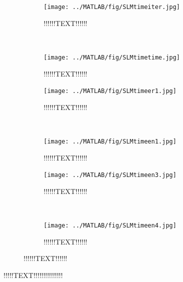 \begin{figure}[H]
        \centering
        \begin{subfigure}[b]{0.3\textwidth}
                \texttt{[image: ../MATLAB/fig/SLMtimeiter.jpg]}
                \caption{ !!!!!!TEXT!!!!!! }
                \label{fig:SLMtimeer1}
        \end{subfigure}
        ~
        \begin{subfigure}[b]{0.3\textwidth}
                \texttt{[image: ../MATLAB/fig/SLMtimetime.jpg]}
                \caption{ !!!!!!TEXT!!!!!! }
                \label{fig:SLMtimeen1}
        \end{subfigure}        
        
        \begin{subfigure}[b]{0.3\textwidth}
                \texttt{[image: ../MATLAB/fig/SLMtimeer1.jpg]}
                \caption{ !!!!!!TEXT!!!!!! }
                \label{fig:SLMtimeer1}
        \end{subfigure}
        ~
        \begin{subfigure}[b]{0.3\textwidth}
                \texttt{[image: ../MATLAB/fig/SLMtimeen1.jpg]}
                \caption{ !!!!!!TEXT!!!!!! }
                \label{fig:SLMtimeen1}
        \end{subfigure}
        
        \begin{subfigure}[b]{0.3\textwidth}
                \texttt{[image: ../MATLAB/fig/SLMtimeen3.jpg]}
                \caption{ !!!!!!TEXT!!!!!! }
                \label{fig:SLMtimeen3}
        \end{subfigure}
        ~
        \begin{subfigure}[b]{0.3\textwidth}
                \texttt{[image: ../MATLAB/fig/SLMtimeen4.jpg]}
                \caption{ !!!!!!TEXT!!!!!! }
                \label{fig:SLMtimeen4}
        \end{subfigure}


        \caption{ !!!!!!TEXT!!!!!!}
        \label{fig:SLMtime}
\end{figure}
!!!!!TEXT!!!!!!!!!!!!!!!\\
